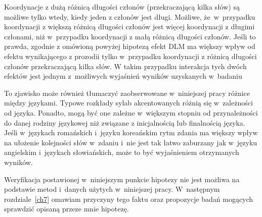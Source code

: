 Koordynacje z dużą różnicą długości członów (przekraczającą kilka słów) są możliwe tylko wtedy, kiedy jeden z członów jest długi. Możliwe,  że~w~przypadku koordynacji z większą różnicą długości członów jest więcej koordynacji z długimi członami, niż w~przypadku koordynacji z małą różnicą długości członów. Jeśli to prawda, zgodnie z omówioną powyżej hipotezą efekt DLM ma większy wpływ od efektu wynikającego z prozodii tylko w~przypadku koordynacji z różnicą długości członów przekraczającą kilka słów. W takim przypadku interakcja tych dwóch efektów jest jednym z~możliwych wyjaśnień wyników uzyskanych w~badaniu \citep{przepiorkowski2024argument}

To zjawisko może również tłumaczyć zaobserwowane w~niniejszej pracy różnice między językami. Typowe rozkłady sylab akcentowanych różnią się w~zależności od języka. Ponadto, mogą być one zależne w~większym stopniu od przynależności do danej rodziny językowej niż związane z inicjalnością lub finalnością języka. Jeśli w~językach romańskich i~języku koreańskim rytm zdania ma większy wpływ na ułożenie kolejności słów w~zdaniu i~nie jest tak łatwo zaburzany jak w~języku angielskim i~językach słowiańskich, może to być wyjaśnieniem otrzymanych wyników.

Weryfikacja postawionej w~niniejszym punkcie hipotezy nie jest możliwa na podstawie metod i~danych użytych w~niniejszej pracy. W~następnym rozdziale~\ref{ch7} omawiam przyczyny tego faktu oraz propozycje badań mogących sprawdzić opisaną przeze mnie hipotezę.